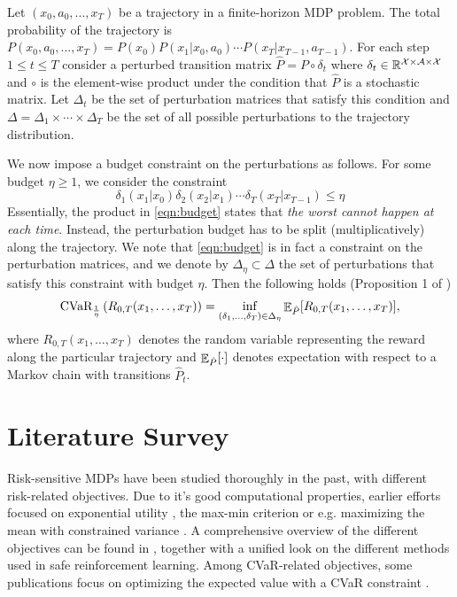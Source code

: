Let $(x_0, a_0, ..., x_T)$ be a trajectory in a finite-horizon MDP problem. The total probability of the trajectory is $P(x_0, a_0, ..., x_T)=P(x_0)P(x_1|x_0,a_0)\cdots P(x_T|x_{T-1}, a_{T-1})$. For each step $1\le t\le T$ consider a perturbed transition matrix $\hat{P} = P \circ \delta_t$ where $\delta_t \in \mathbb{R}^{\mathcal{X}\times\mathcal{A}\times\mathcal{X}}$ and $\circ$ is the element-wise product under the condition that $\hat{P}$ is a stochastic matrix. Let $\Delta_t$ be the set of perturbation matrices that satisfy this condition and $\Delta = \Delta_1 \times \cdots \times \Delta_T$ be the set of all possible perturbations to the trajectory distribution.

We now impose a budget constraint on the perturbations as follows. For some budget $\eta \geq 1$, we consider the constraint
\begin{equation}\label{eqn:budget}
    \delta_1(x_1|x_0)\delta_2(x_2|x_1)\cdots \delta_T(x_T|x_{T-1}) \leq \eta
\end{equation}
Essentially, the product in \eqref{eqn:budget} states that \emph{the worst cannot happen at each time}. Instead, the perturbation budget has to be split (multiplicatively) along the trajectory. We note that \eqref{eqn:budget} is in fact a constraint on the perturbation matrices, and we denote by $\Delta_\eta \subset \Delta$ the set of perturbations that satisfy this constraint with budget $\eta$.
Then the following holds (Proposition 1 of \citep{chow2015risk})
\begin{equation}\label{eq:CVaR_is_robustness}
    \text{CVaR}_{\frac{1}{\eta}} \left(R_{0,T}(x_1,\dots,x_T)\right) = \inf_{(\delta_1,\dots,\delta_T)\in \Delta_{\eta}} \mathop{\mathbb{E}}\nolimits_{\hat{P}}[R_{0,T}(x_1,\dots,x_T)],
\end{equation}
where $R_{0,T}(x_1,\dots,x_T)$ denotes the random variable representing the reward along the particular trajectory and $\mathop{\mathbb{E}}\nolimits_{\hat{P}}[\cdot]$ denotes expectation with respect to a Markov chain with transitions $\hat{P}_t$.





\section{Literature Survey}\label{sec:prelim:literature}

Risk-sensitive MDPs have been studied thoroughly in the past, with different risk-related objectives. Due to it's good computational properties, earlier efforts focused on exponential utility \citep{howard1972risk}, the max-min criterion \cite{minmax} or e.g. maximizing the mean with constrained variance \citep{sobel1982variance}. A comprehensive overview of the different objectives can be found in \citet{garcia2015comprehensive}, together with a unified look on the different methods used in safe reinforcement learning. Among CVaR-related objectives, some publications focus on optimizing the expected value with a CVaR constraint \citep{borkar2010risk, prashanth2014policy}.

